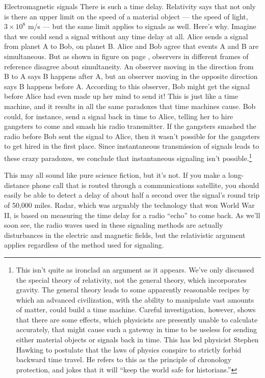 \begin{envsubsection}{Electromagnetic signals}
There is such a time
delay. Relativity says that not only is there an upper
limit on the speed of a material object --- the speed of
light, $3\times10^8$ m/s --- but the same limit applies to signals
as well. Here's why. Imagine that we could send a signal without any time delay
at all. Alice sends a signal from planet A to Bob, on planet B.
Alice and Bob agree that events A and B are simultaneous.
 But as shown
in figure  on page \pageref{fig:simultaneity},
observers in different frames of reference disagree
about simultaneity. An observer moving in the direction from B to
A says B happens after A, but an observer moving in the opposite
direction says B happens before A. According to this observer, Bob
might get the signal before Alice had even made up her mind to send it!
This is just like a time machine, and it results in all the same paradoxes
that time machines cause. Bob could, for instance, send a signal back in
time to Alice, telling her to hire gangsters to come and smash
his radio transmitter. If the gangsters smashed the radio before Bob sent
the signal to Alice, then it wasn't possible for the gangsters to
get hired in the first place. Since instantaneous transmission of signals
leads to these crazy paradoxes, we conclude that instantaneous signaling isn't
possible.\footnote{This isn't quite as ironclad an argument as it appears.
We've only discussed the special theory of relativity, not the general theory,
which incorporates gravity. The general theory leads to some apparently
reasonable recipes by which an advanced civilization, with the ability to
manipulate vast amounts of matter, could build a time machine. Careful investigation,
however, shows that there are some effects, which physicists are presently
unable to calculate accurately, that might cause such a gateway in time to
be useless for sending either material objects or signals back in time.
This has led physicist Stephen Hawking to postulate that the laws of physics
conspire to strictly forbid backward time travel. He refers to this as the principle
of chronology protection, and jokes that it will ``keep the world safe for
historians.''}

This may all sound like pure science fiction, but it's not.
If you make a long-distance phone call that is routed
through a communications satellite, you should easily be
able to detect a delay of about half a second over the
signal's round trip of 50,000 miles. Radar, which was arguably
the technology that won World War II, is based on measuring the
time delay for a radio ``echo'' to come back.
As we'll soon see, the radio waves used in these signaling methods
are actually disturbances in the electric and magnetic fields, but the
relativistic argument applies regardless of the method used for
signaling.


\end{envsubsection}
